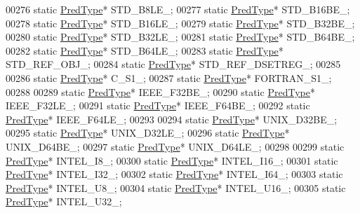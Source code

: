 \begin{DoxyCode}
00276         \textcolor{keyword}{static} \hyperlink{class_h5_1_1_pred_type}{PredType}* STD\_B8LE\_;
00277         \textcolor{keyword}{static} \hyperlink{class_h5_1_1_pred_type}{PredType}* STD\_B16BE\_;
00278         \textcolor{keyword}{static} \hyperlink{class_h5_1_1_pred_type}{PredType}* STD\_B16LE\_;
00279         \textcolor{keyword}{static} \hyperlink{class_h5_1_1_pred_type}{PredType}* STD\_B32BE\_;
00280         \textcolor{keyword}{static} \hyperlink{class_h5_1_1_pred_type}{PredType}* STD\_B32LE\_;
00281         \textcolor{keyword}{static} \hyperlink{class_h5_1_1_pred_type}{PredType}* STD\_B64BE\_;
00282         \textcolor{keyword}{static} \hyperlink{class_h5_1_1_pred_type}{PredType}* STD\_B64LE\_;
00283         \textcolor{keyword}{static} \hyperlink{class_h5_1_1_pred_type}{PredType}* STD\_REF\_OBJ\_;
00284         \textcolor{keyword}{static} \hyperlink{class_h5_1_1_pred_type}{PredType}* STD\_REF\_DSETREG\_;
00285 
00286         \textcolor{keyword}{static} \hyperlink{class_h5_1_1_pred_type}{PredType}* C\_S1\_;
00287         \textcolor{keyword}{static} \hyperlink{class_h5_1_1_pred_type}{PredType}* FORTRAN\_S1\_;
00288 
00289         \textcolor{keyword}{static} \hyperlink{class_h5_1_1_pred_type}{PredType}* IEEE\_F32BE\_;
00290         \textcolor{keyword}{static} \hyperlink{class_h5_1_1_pred_type}{PredType}* IEEE\_F32LE\_;
00291         \textcolor{keyword}{static} \hyperlink{class_h5_1_1_pred_type}{PredType}* IEEE\_F64BE\_;
00292         \textcolor{keyword}{static} \hyperlink{class_h5_1_1_pred_type}{PredType}* IEEE\_F64LE\_;
00293 
00294         \textcolor{keyword}{static} \hyperlink{class_h5_1_1_pred_type}{PredType}* UNIX\_D32BE\_;
00295         \textcolor{keyword}{static} \hyperlink{class_h5_1_1_pred_type}{PredType}* UNIX\_D32LE\_;
00296         \textcolor{keyword}{static} \hyperlink{class_h5_1_1_pred_type}{PredType}* UNIX\_D64BE\_;
00297         \textcolor{keyword}{static} \hyperlink{class_h5_1_1_pred_type}{PredType}* UNIX\_D64LE\_;
00298 
00299         \textcolor{keyword}{static} \hyperlink{class_h5_1_1_pred_type}{PredType}* INTEL\_I8\_;
00300         \textcolor{keyword}{static} \hyperlink{class_h5_1_1_pred_type}{PredType}* INTEL\_I16\_;
00301         \textcolor{keyword}{static} \hyperlink{class_h5_1_1_pred_type}{PredType}* INTEL\_I32\_;
00302         \textcolor{keyword}{static} \hyperlink{class_h5_1_1_pred_type}{PredType}* INTEL\_I64\_;
00303         \textcolor{keyword}{static} \hyperlink{class_h5_1_1_pred_type}{PredType}* INTEL\_U8\_;
00304         \textcolor{keyword}{static} \hyperlink{class_h5_1_1_pred_type}{PredType}* INTEL\_U16\_;
00305         \textcolor{keyword}{static} \hyperlink{class_h5_1_1_pred_type}{PredType}* INTEL\_U32\_;

\end{DoxyCode}
